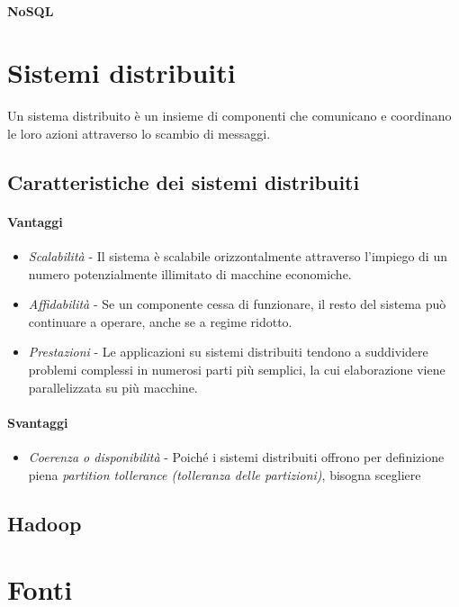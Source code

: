 \documentclass{article}
\begin{document}
        \paragraph{NoSQL}

\section{Sistemi distribuiti}
    Un sistema distribuito è un insieme di componenti che comunicano e coordinano le loro azioni attraverso lo scambio di messaggi.
    \subsection{Caratteristiche dei sistemi distribuiti}
        \paragraph{Vantaggi}
            \begin{itemize}
                \item \textit{Scalabilità} - Il sistema è scalabile orizzontalmente attraverso l'impiego di un numero potenzialmente illimitato di macchine economiche.
                \item \textit{Affidabilità} - Se un componente cessa di funzionare, il resto del sistema può continuare a operare, anche se a regime ridotto.
                \item \textit{Prestazioni} - Le applicazioni su sistemi distribuiti tendono a suddividere problemi complessi in numerosi parti più semplici, la cui elaborazione viene parallelizzata su più macchine.
            \end{itemize}
        \paragraph{Svantaggi}
            \begin{itemize}
                \item \textit{Coerenza o disponibilità} - Poiché i sistemi distribuiti offrono per definizione piena \textit{partition tollerance (tolleranza delle partizioni)}, bisogna scegliere 
            \end{itemize}
        
    \subsection{Hadoop}

\section{Fonti}
\end{document}
